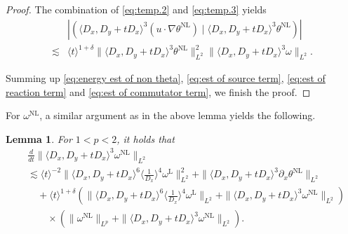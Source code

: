 \documentclass[reqno, 12pt]{amsart} %
\theoremstyle{plain} %
\newtheorem{Lem}[Thm]{Lemma}     %
\theoremstyle{definition}
\theoremstyle{remark}
\numberwithin{equation}{section} %
\newcommand{\px}{\partial_x}
\begin{document}
\begin{proof}
		The combination of \eqref{eq:temp.2} and \eqref{eq:temp.3} yields
		\begin{equation}\begin{aligned} \label{eq:est of commutator term}
				& \left|\left(\langle D_x, D_y+t D_x\rangle^3\left(u \cdot \nabla \theta^{\mathrm{NL}}\right) \mid\langle D_x, D_y+t D_x\rangle^3 \theta^{\mathrm{NL}}\right)\right| \\
				\lesssim & \langle t\rangle^{1+\delta}\|\langle D_x, D_y+t D_x\rangle^3 \theta^{\mathrm{NL}}\|_{L^2}^2\|\langle D_x, D_y+t D_x\rangle^3 \omega\|_{L^2}.
		\end{aligned}\end{equation}
		
		
		
		Summing up \eqref{eq:energy est of non theta}, \eqref{eq:est of source term}, \eqref{eq:est of reaction term} and  \eqref{eq:est of commutator term}, we finish the proof.
	\end{proof}
	
	For $\omega^{\mathrm{NL}}$, a similar argument as in the above lemma yields the following.
	\begin{Lem} \label{lem:est of omega L2}
		For $1<p<2$, it holds that
		\begin{equation*}
			\begin{aligned}
				&\frac{d}{d t}\|\langle D_x, D_y +t D_x\rangle^3 \omega^{\mathrm{NL}}\|_{L^2} \\
				&\lesssim\langle t\rangle^{-2} \|\langle D_x, D_y+t D_x\rangle^6\langle\frac{1}{D_x}\rangle^4 \omega^{\mathrm{L}}\|_{L^2}^2    +     \|\langle D_x, D_y+t D_x\rangle^3 \px \theta^{\mathrm{NL}}\|_{L^2}    \\
				&\quad +\langle t\rangle^{1+\delta}( \|\langle D_x, D_y+t D_x\rangle^6\langle\frac{1}{D_x}\rangle^4 \omega^{\mathrm{L}}\|_{L^2} +\|\langle D_x, D_y+t D_x\rangle^3 \omega^{\mathrm{NL}}\|_{L^2}) \\
				&\quad \quad \times(\|\omega^{\mathrm{NL}}\|_{L^p}+\|\langle D_x, D_y+t D_x\rangle^3 \omega^{\mathrm{NL}}\|_{L^2}) .
			\end{aligned}
		\end{equation*}
	\end{Lem}
	
\end{document}
